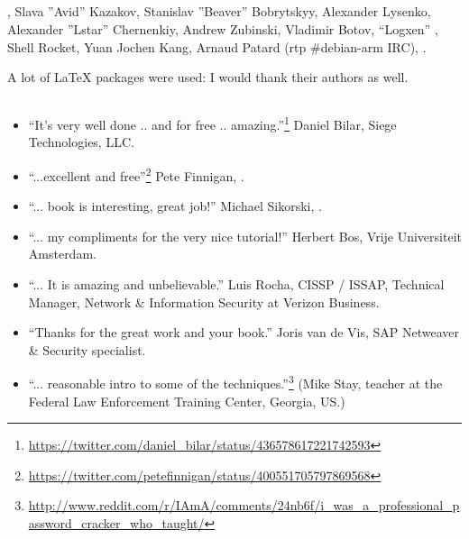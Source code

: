 \subsection*{}

\HERMIT, 
{Slava ''Avid'' Kazakov, Stanislav ''Beaver'' Bobrytskyy, Alexander Lysenko, 
Alexander ''Lstar'' Chernenkiy, Andrew Zubinski, Vladimir Botov},  ``Logxen'' ,
Shell Rocket, Yuan Jochen Kang, Arnaud Patard (rtp  \#debian-arm IRC), 
.

{A lot of \LaTeX{} packages were used: I would thank their authors as well}.

\subsection*{}

\begin{itemize}
\item ``It's very well done .. and for free .. amazing.''\footnote{\url{https://twitter.com/daniel_bilar/status/436578617221742593}} Daniel Bilar, Siege Technologies, LLC.

\item ``...excellent and free''\footnote{\url{https://twitter.com/petefinnigan/status/400551705797869568}} Pete Finnigan, \oracle{}.

\item ``... book is interesting, great job!'' Michael Sikorski,  .

\item ``... my compliments for the very nice tutorial!'' Herbert Bos,  Vrije Universiteit Amsterdam.

\item ``... It is amazing and unbelievable.'' Luis Rocha, CISSP / ISSAP, Technical Manager, Network \& Information Security at Verizon Business.

\item ``Thanks for the great work and your book.'' Joris van de Vis, SAP Netweaver \& Security specialist.

\item ``... reasonable intro to some of the techniques.''\footnote{\url{http://www.reddit.com/r/IAmA/comments/24nb6f/i_was_a_professional_password_cracker_who_taught/}} (Mike Stay, teacher at the Federal Law Enforcement Training Center, Georgia, US.)

\end{itemize}

